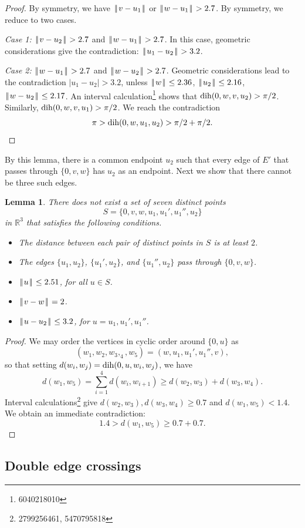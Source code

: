 \documentclass[11pt]{amsart}
\def\op#1{{\text{#1}}}
\newcommand{\ring}[1]{\mathbb{#1}}
\def\dih{\op{dih}}
\def\text{\hbox}
\def\|{{\hskip0.1em|\hskip-0.15em|\hskip0.1em}}
\newtheorem{lemma}{Lemma}
\begin{document}
\begin{proof}
By symmetry, we have $\|v-u_1\|$ or $\|w-u_1\|>2.7$.  By symmetry, we reduce to two cases.

{\it Case 1:}  $\|v-u_2\|>2.7$ and $\|w-u_1\|> 2.7$.  In this case, geometric considerations
give the contradiction:  $\|u_1-u_2\| > 3.2$.

{\it Case 2:}  $\|w-u_1\|>2.7$ and $\|w-u_2\|>2.7$.  Geometric considerations lead to the contradiction
$|u_1-u_2|>3.2$, unless $\|w\|\le 2.36$, $\|u_2\|\le 2.16$, $\|w-u_2\|\le 2.17$.  An interval calculation\footnote{6040218010}
shows that
$\op{dih}(0,w,v,u_2)>\pi/2$.
Similarly, $\op{dih}(0,w,v,u_1)>\pi/2$.  We reach the contradiction
$$
\pi > \op{dih}(0,w,u_1,u_2) > \pi/2 + \pi/2.
$$
\end{proof}

By this lemma, there is a common endpoint $u_2$ such that every edge
of $E'$ that passes through $\{0,v,w\}$ has $u_2$ as an endpoint.
Next we show that there cannot be three such edges.  


\begin{lemma}\label{lemma:three-edge}
There does not exist a set of seven distinct points
$$S=\{0,v,w,u_1,u_1',u_1'',u_2\}$$ in $\ring{R}^3$ that satisfies
the following conditions.
\begin{itemize}
\item The distance between each pair of distinct points in $S$ is at least $2$.
\item The edges $\{u_1,u_2\}$, $\{u_1',u_2\}$, and $\{u_1'',u_2\}$ pass through
$\{0,v,w\}$.
\item $\|u\|\le 2.51$, for all $u\in S$.
\item $\|v-w\|=2$.
\item $\|u-u_2\|\le 3.2$, for $u=u_1,u_1',u_1''$.
\end{itemize}
\end{lemma}

\begin{proof}
We may order the vertices in cyclic order around $\{0,u\}$ as
$$(w_1,w_2,w_3,_4,w_5)=(w,u_1,u_1',u_1'',v),$$ 
so that setting
$d(w_i,w_j) = \dih(0,u,w_i,w_j)$, we have
$$d(w_1,w_5)=\sum_{i=1}^4 d(w_i,w_{i+1})\ge d(w_2,w_3)+d(w_3,w_4).$$
Interval calculations\footnote{2799256461, 5470795818} 
give $d(w_2,w_3),d(w_3,w_4)\ge 0.7$
and $d(w_1,w_5)< 1.4$. We obtain an immediate contradiction:
$$1.4 > d(w_1,w_5) \ge 0.7 + 0.7.$$
\end{proof}

\subsection*{Double edge crossings}
\end{document}
